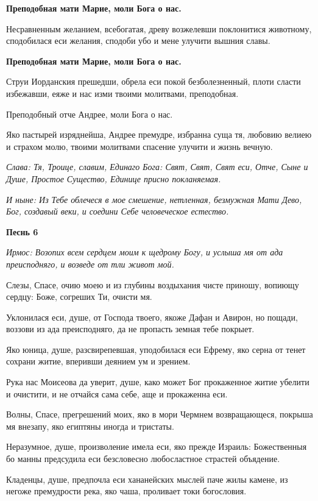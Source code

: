 \bfseries Преподобная мати Марие, моли Бога о нас.\normalfont{}


Несравненным желанием, всебогатая, древу возжелевши поклонитися животному, сподобилася еси желания, сподоби убо и мене улучити вышния славы.


\bfseries Преподобная мати Марие, моли Бога о нас.\normalfont{}


Струи Иорданския прешедши, обрела еси покой безболезненный, плоти сласти избежавши, еяже и нас изми твоими молитвами, преподобная.


Преподобный отче Андрее, моли Бога о нас.


Яко пастырей изряднейша, Андрее премудре, избранна суща тя, любовию велиею и страхом молю, твоими молитвами спасение улучити и жизнь вечную.


\itshape Слава\normalfont{}: Тя, Троице, славим, Единаго Бога: Свят, Свят, Свят еси, Отче, Сыне и Душе, Простое Существо, Единице присно покланяемая.


\itshape И ныне\normalfont{}: Из Тебе облечеся в мое смешение, нетленная, безмужная Мати Дево, Бог, создавый веки, и соедини Себе человеческое естество. 


\medskip
\bfseries Песнь 6\normalfont{}


\itshape Ирмос\normalfont{}: Возопих всем сердцем моим к щедрому Богу, и услыша мя от ада преисподняго, и возведе от тли живот мой.


Слезы, Спасе, очию моею и из глубины воздыхания чисте приношу, вопиющу сердцу: Боже, согреших Ти, очисти мя.


Уклонилася еси, душе, от Господа твоего, якоже Дафан и Авирон, но пощади, воззови из ада преисподняго, да не пропасть земная тебе покрыет.


Яко юница, душе, разсвирепевшая, уподобилася еси Ефрему, яко серна от тенет сохрани житие, вперивши деянием ум и зрением.


Рука нас Моисеова да уверит, душе, како может Бог прокаженное житие убелити и очистити, и не отчайся сама себе, аще и прокаженна еси.


Волны, Спасе, прегрешений моих, яко в мори Чермнем возвращающеся, покрыша мя внезапу, яко египтяны иногда и тристаты.


Неразумное, душе, произволение имела еси, яко прежде Израиль: Божественныя бо манны предсудила еси безсловесно любосластное страстей объядение.


Кладенцы, душе, предпочла еси хананейских мыслей паче жилы камене, из негоже премудрости река, яко чаша, проливает токи богословия.


